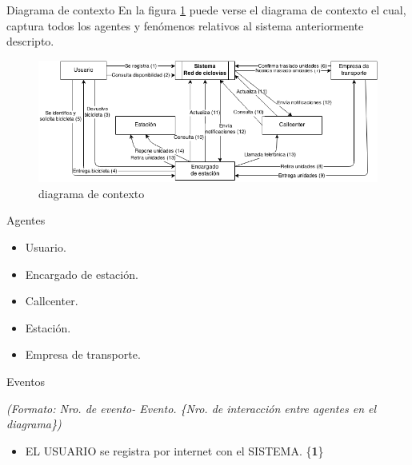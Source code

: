 
\begin{subsection}{Diagrama de contexto}
En la figura \ref{fig:diagrama_contexto} puede verse el diagrama de contexto el cual, captura todos los agentes y fenómenos relativos al sistema anteriormente descripto.

\begin{figure}[!ht]
\begin{center}
\includegraphics[scale=0.60]{imagenes/diagrama_contexto.png}
\caption{diagrama de contexto}
\label{fig:diagrama_contexto}
\end{center}
\end{figure}
\end{subsection}

\begin{subsection}{Agentes}
	\begin{itemize}
	\item Usuario.
	\item Encargado de estación.
	\item Callcenter.
	\item Estación.
	\item Empresa de transporte.
	\end{itemize}
\end{subsection}

\begin{subsection}{Eventos}

\textit{(Formato: Nro. de evento- Evento. \{Nro. de interacción entre agentes en el diagrama\})}

	\begin{itemize}
	\item [1-] EL USUARIO se registra por internet con el SISTEMA. \{\textbf{1}\}
	\end{itemize} 

\end{subsection}